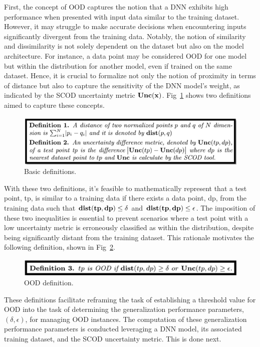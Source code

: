 First, the concept of OOD captures the notion that a DNN exhibits high performance when presented with input data similar to the training dataset. However, it may struggle to make accurate decisions when encountering inputs significantly divergent from the training data. Notably, the notion of similarity and dissimilarity is not solely dependent on the dataset but also on the model architecture. For instance, a data point may be considered OOD for one model but within the distribution for another model, even if trained on the same dataset. Hence, it is crucial to formalize not only the notion of proximity in terms of distance but also to capture the sensitivity of the DNN model's weight, as indicated by the SCOD uncertainty metric $\bf{Unc}(x)$. Fig~\ref{fig:Bd} shows two definitions aimed to capture these concepts.
\begin{figure}[ht]
\centering
\includegraphics[scale=0.65]{Fig/OOD_def.png}
\caption{Basic definitions.}
\label{fig:Bd}
\end{figure}
With these two definitions, it's feasible to mathematically represent that a test point, tp, is similar to a  training data  if there exists a data point, dp, from the training data such that $\bf{dist}(tp, dp) \leq \delta$ and $\bf{dist}(tp, dp) \leq \epsilon$. The imposition of these two inequalities is essential to prevent scenarios where a test point with a low uncertainty metric is erroneously classified as within the distribution, despite being significantly distant from the training dataset. This rationale motivates the following definition, shown in Fig~\ref{fig:OOD}. 
\begin{figure}[ht]
\centering
\includegraphics[scale=0.75]{Fig/OOD_def2.png}
\caption{OOD definition.}
\label{fig:OOD}
\end{figure}
These definitions facilitate reframing the task of establishing a threshold value for OOD into the task of determining the generalization performance parameters, $(\delta,\epsilon)$, for managing OOD instances. The computation of these generalization performance parameters is conducted leveraging a DNN model, its associated training dataset, and the SCOD uncertainty metric. This is done next.
 
